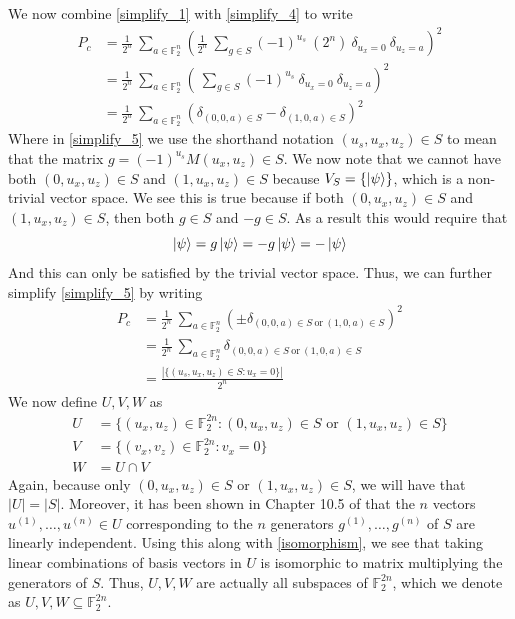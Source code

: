 \documentclass[11pt]{article}
\theoremstyle{definition}
\theoremstyle{plain}
\begin{document}
We now combine {\ref{simplify_1}} with {\ref{simplify_4}} to write
\begin{align}
P_c &= \frac{1}{2^{n}} \  \sum\limits_{a \in \mathbb{F}_2^n}
        {\left( \frac{1}{2^n} \ \sum\limits_{g \in S}
      {(-1)}^{u_s} \ (2^n) \ \delta_{u_x = 0} \ \delta_{u_z = a}  \right)}^2 \\
    &=  \frac{1}{2^{n}} \  \sum\limits_{a \in \mathbb{F}_2^n}
      {\left( \ \sum\limits_{g \in S}
      {(-1)}^{u_s} \ \delta_{u_x = 0} \ \delta_{u_z = a}  \right)}^2 \\
    &=  \frac{1}{2^{n}} \  \sum\limits_{a \in \mathbb{F}_2^n}
      {\left( \delta_{(0, 0, a) \in S} -
      \delta_{(1, 0, a)\in S} \right)}^2 \label{simplify_5}
\end{align}
Where in {\ref{simplify_5}} we use the shorthand notation $(u_s, u_x, u_z) \in S$ to mean that the matrix $g = {(-1)}^{u_s} M(u_x, u_z) \in S$. We now note that we cannot have both $(0, u_x, u_z) \in S$ and $(1, u_x, u_z) \in S$ because $V_S = \{ \ket{\psi} \}$, which is a non-trivial vector space. We see this is true because if both $(0, u_x, u_z) \in S$ and $(1, u_x, u_z) \in S$, then both $g \in S$ and $-g \in S$. As a result this would require that
\begin{equation}
  \ket{\psi} = g \ket{\psi} = -g \ket{\psi} = - \ket{\psi}
\end{equation}
And this can only be satisfied by the trivial vector space. Thus, we can further simplify {\ref{simplify_5}} by writing
\begin{align}
  P_c &=  \frac{1}{2^{n}} \  \sum\limits_{a \in \mathbb{F}_2^n}
      {\left( \pm \delta_{(0, 0, a) \in S \ \text{or} \ (1, 0, a) \in S } \right)}^2 \\
      &= \frac{1}{2^{n}} \  \sum\limits_{a \in \mathbb{F}_2^n}
        \delta_{(0, 0, a) \in S \ \text{or} \ (1, 0, a) \in S} \\ 
      &= \frac{ |\{(u_s, u_x, u_z) \in S : u_x = 0 \}| } {2^n} 
\end{align}
We now define $U, V, W$ as
\begin{align}
  U &= \{(u_x, u_z) \in \mathbb{F}_2^{2n} : (0, u_x, u_z) \in S \text{ or }
  (1, u_x, u_z) \in S \} \label{simplify_6}\\
  V &= \{(v_x, v_z) \in \mathbb{F}_2^{2n} : v_x = 0 \} \label{simplify_7}\\
  W &= U \cap V \label{simplify_8}
\end{align}
Again, because only $(0, u_x, u_z) \in S$ or $(1, u_x, u_z) \in S$, we will have that $|U| = |S|$. Moreover, it has been shown in Chapter 10.5 of {\cite{nc}} that the $n$ vectors $u^{(1)}, \ldots, u^{(n)} \in U$ corresponding to the $n$ generators $g^{(1)}, \ldots, g^{(n)}$ of $S$ are linearly independent. Using this along with {\ref{isomorphism}}, we see that taking linear combinations of basis vectors in $U$ is isomorphic to matrix multiplying the generators of $S$. Thus, $U, V, W$ are actually all subspaces of $\mathbb{F}_2^{2n}$, which we denote as $U, V, W \subseteq \mathbb{F}_2^{2n}$.
\end{document}
